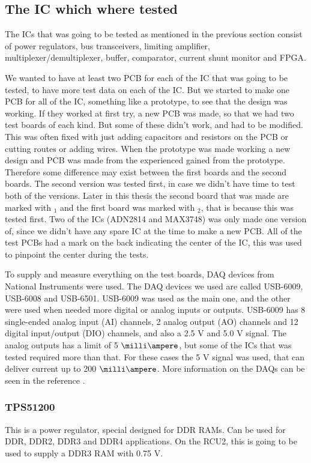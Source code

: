 \documentclass[12pt]{article}
\numberwithin{figure}{section}
\begin{document}
\subsection{The \ac{IC} which where tested}
The \ac{IC}s that was going to be tested as mentioned in the previous section consist of power regulators, bus transceivers, limiting amplifier, multiplexer/demultiplexer, buffer, comparator, current shunt monitor and FPGA.

We wanted to have at least two \ac{PCB} for each of the \ac{IC} that was going to be tested, to have more test data on each of the \ac{IC}.
But we started to make one PCB for all of the \ac{IC}, something like a prototype, to see that the design was working.
If they worked at first try, a new \ac{PCB} was made, so that we had two test boards of each kind.
But some of these didn't work, and had to be modified.
This was often fixed with just adding capacitors and resistors on the \ac{PCB} or cutting routes or adding wires.
When the prototype was made working a new design and PCB was made from the experienced gained from the prototype.
Therefore some difference may exist between the first boards and the second boards.
The second version was tested first, in case we didn't have time to test both of the versions.
Later in this thesis the second board that was made are marked with $_1$ and the first board was marked with $_2$, that is because this was tested first.
Two of the \ac{IC}s (ADN2814 and MAX3748) was only made one version of, since we didn't have any spare \ac{IC} at the time to make a new \ac{PCB}.
All of the test \ac{PCB}s had a mark on the back indicating the center of the \ac{IC}, this was used to pinpoint the center during the tests.

To supply and measure everything on the test boards, \acf{DAQ} devices from National Instruments were used.
The \ac{DAQ} devices we used are called USB-6009, USB-6008 and USB-6501. USB-6009 was used as the main one, and the other were used when needed more digital or analog inputs or outputs.
USB-6009 has 8 single-ended analog input (AI) channels, 2 analog output (AO) channels and 12 digital input/output (DIO) channels, and also a 2.5 V and 5.0 V signal.
The analog outputs has a limit of 5 $\milli\ampere$, but some of the \ac{IC}s that was tested required more than that. For these cases the 5 V signal was used, that can deliver current up to 200 $\milli\ampere$.
More information on the DAQs can be seen in the reference \cite{website:DAQ}.

\subsubsection{TPS51200}
\label{TPS_explanation}
This is a power regulator, special designed for DDR RAMs. Can be used for DDR, DDR2, DDR3 and DDR4 applications. On the \ac{RCU2}, this is going to be used to supply a DDR3 RAM with 0.75 V.
\end{document}
